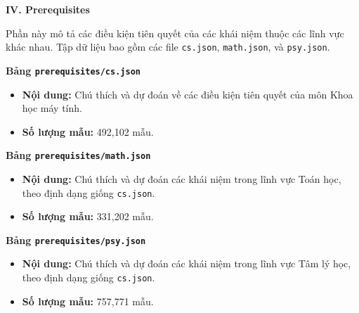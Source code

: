 \textbf{IV. Prerequisites}

Phần này mô tả các điều kiện tiên quyết của các khái niệm thuộc các lĩnh vực khác nhau. Tập dữ liệu bao gồm các file \texttt{cs.json}, \texttt{math.json}, và \texttt{psy.json}.

\textbf{Bảng \texttt{prerequisites/cs.json}}

\begin{itemize}
    \item \textbf{Nội dung:} Chú thích và dự đoán về các điều kiện tiên quyết của môn Khoa học máy tính.
    \item \textbf{Số lượng mẫu:} 492,102 mẫu.
\end{itemize}

\begin{table}[H]
\centering
{}
\caption{Cấu trúc bảng \texttt{prerequisites/cs.json}}
\end{table}

\textbf{Bảng \texttt{prerequisites/math.json}}

\begin{itemize}
    \item \textbf{Nội dung:} Chú thích và dự đoán các khái niệm trong lĩnh vực Toán học, theo định dạng giống \texttt{cs.json}.
    \item \textbf{Số lượng mẫu:} 331,202 mẫu.
\end{itemize}

\textbf{Bảng \texttt{prerequisites/psy.json}}

\begin{itemize}
    \item \textbf{Nội dung:} Chú thích và dự đoán các khái niệm trong lĩnh vực Tâm lý học, theo định dạng giống \texttt{cs.json}.
    \item \textbf{Số lượng mẫu:} 757,771 mẫu.
\end{itemize}

